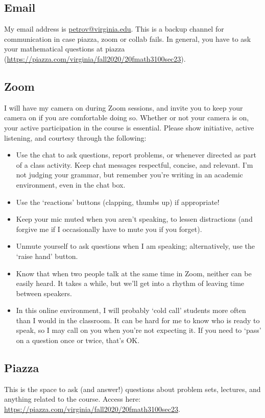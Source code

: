\documentclass[oneside,11pt]{amsart}
\begin{document}
\subsection{Email}
\label{sub:email}

My email address is \href{mailto:petrov@virginia.edu}{petrov@virginia.edu}.
This is a backup channel for communication in case piazza, zoom or collab fails.
In general, you have to
ask your mathematical questions at piazza (\url{https://piazza.com/virginia/fall2020/20fmath3100sec23}).

\subsection{Zoom}
\label{sub:zoom}

I will have my camera on during Zoom sessions, and invite you to keep
your camera on if you are comfortable doing so. Whether or not your
camera is on, your active participation in the course is essential.
Please show initiative, active listening, and courtesy through the
following: 
\begin{itemize}
	\item 
Use the chat to ask questions, report problems, or whenever directed as part of a class activity. Keep chat messages respectful, concise, and relevant. I’m not judging your grammar, but remember you’re writing in an academic environment, even in the chat box. 
\item 
Use the ‘reactions’ buttons (clapping, thumbs up) if appropriate!
\item 
Keep your mic muted when you aren’t speaking, to lessen distractions (and forgive me if I occasionally have to mute you if you forget).
\item 
	Unmute yourself to ask questions when I am speaking; alternatively,
	use the ‘raise hand’ button.
\item 
Know that when two people talk at the same time in Zoom, neither can be easily heard. It takes a while, but we’ll get into a rhythm of leaving time between speakers.
\item 
In this online environment, I will probably ‘cold call’ students more often than I would in the classroom. It can be hard for me to know who is ready to speak, so I may call on you when you’re not expecting it. If you need to ‘pass’ on a question once or twice, that’s OK.
		
\end{itemize}

\subsection{Piazza}
This is the space to ask (and answer!) 
questions about problem sets, 
lectures, and anything related to the course.
Access here:
\url{https://piazza.com/virginia/fall2020/20fmath3100sec23}.
\end{document}
